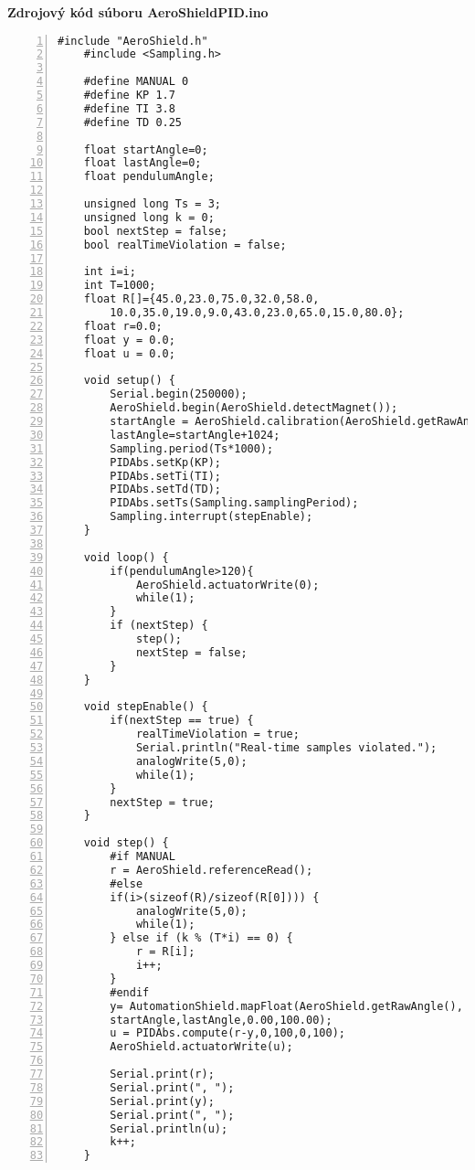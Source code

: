 \LARGE\bf{Zdrojový kód súboru AeroShieldPID.ino}
\label{AeroShieldPID.ino}
\vspace{1cm}
\begin{lstlisting}[numbers=left,basicstyle=\scriptsize,caption={Zdrojový kód súboru AeroShieldPID.ino.},captionpos=b]	
	#include "AeroShield.h"              
	#include <Sampling.h>   
	
	#define MANUAL 0    
	#define KP 1.7  
	#define TI 3.8  
	#define TD 0.25   
	
	float startAngle=0; 
	float lastAngle=0; 
	float pendulumAngle;
	
	unsigned long Ts = 3; 
	unsigned long k = 0; 
	bool nextStep = false;  
	bool realTimeViolation = false;
	
	int i=i;          
	int T=1000;           
	float R[]={45.0,23.0,75.0,32.0,58.0,
		10.0,35.0,19.0,9.0,43.0,23.0,65.0,15.0,80.0}; 
	float r=0.0;          
	float y = 0.0;        
	float u = 0.0;         
	
	void setup() {           
		Serial.begin(250000);                         
		AeroShield.begin(AeroShield.detectMagnet());
		startAngle = AeroShield.calibration(AeroShield.getRawAngle()); 
		lastAngle=startAngle+1024;                                  
		Sampling.period(Ts*1000);      
		PIDAbs.setKp(KP);       
		PIDAbs.setTi(TI);    
		PIDAbs.setTd(TD);     
		PIDAbs.setTs(Sampling.samplingPeriod); 
		Sampling.interrupt(stepEnable); 
	}
	
	void loop() {
		if(pendulumAngle>120){
			AeroShield.actuatorWrite(0);
			while(1);
		} 
		if (nextStep) {    
			step();          
			nextStep = false;  
		}
	}
	
	void stepEnable() {             
		if(nextStep == true) {         
			realTimeViolation = true;   
			Serial.println("Real-time samples violated."); 
			analogWrite(5,0);  
			while(1);    
		}
		nextStep = true; 
	}
	
	void step() {  
		#if MANUAL                       
		r = AeroShield.referenceRead(); 
		#else        
		if(i>(sizeof(R)/sizeof(R[0]))) {  
			analogWrite(5,0); 
			while(1); 
		} else if (k % (T*i) == 0) {
			r = R[i];
			i++; 
		}
		#endif
		y= AutomationShield.mapFloat(AeroShield.getRawAngle(),
		startAngle,lastAngle,0.00,100.00);
		u = PIDAbs.compute(r-y,0,100,0,100);
		AeroShield.actuatorWrite(u);
		
		Serial.print(r);
		Serial.print(", ");
		Serial.print(y); 
		Serial.print(", ");
		Serial.println(u); 
		k++; 
	}
\end{lstlisting}